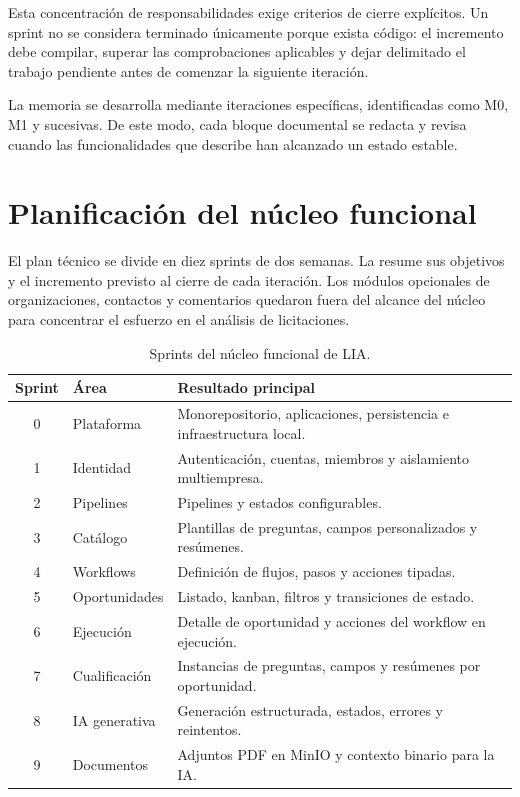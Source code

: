 Esta concentración de responsabilidades exige criterios de cierre explícitos.
Un sprint no se considera terminado únicamente porque exista código: el
incremento debe compilar, superar las comprobaciones aplicables y dejar
delimitado el trabajo pendiente antes de comenzar la siguiente iteración.

La memoria se desarrolla mediante iteraciones específicas, identificadas como
M0, M1 y sucesivas. De este modo, cada bloque documental se redacta y revisa
cuando las funcionalidades que describe han alcanzado un estado estable.

\section{Planificación del núcleo funcional}

El plan técnico se divide en diez sprints de dos semanas. La
 resume sus objetivos y el incremento previsto al cierre
de cada iteración. Los módulos opcionales de organizaciones, contactos y
comentarios quedaron fuera del alcance del núcleo para concentrar el esfuerzo
en el análisis de licitaciones.

\begin{table}[H]
  \centering
  \small
  \caption{Sprints del núcleo funcional de LIA.}
  \label{tab:core-sprints}
  \begin{tabular}{@{}clp{8.4cm}@{}}
    \toprule
    \textbf{Sprint} & \textbf{Área} & \textbf{Resultado principal} \\
    \midrule
    0 & Plataforma & Monorepositorio, aplicaciones, persistencia e infraestructura local. \\
    1 & Identidad & Autenticación, cuentas, miembros y aislamiento multiempresa. \\
    2 & Pipelines & Pipelines y estados configurables. \\
    3 & Catálogo & Plantillas de preguntas, campos personalizados y resúmenes. \\
    4 & Workflows & Definición de flujos, pasos y acciones tipadas. \\
    5 & Oportunidades & Listado, kanban, filtros y transiciones de estado. \\
    6 & Ejecución & Detalle de oportunidad y acciones del workflow en ejecución. \\
    7 & Cualificación & Instancias de preguntas, campos y resúmenes por oportunidad. \\
    8 & IA generativa & Generación estructurada, estados, errores y reintentos. \\
    9 & Documentos & Adjuntos PDF en MinIO y contexto binario para la IA. \\
    \bottomrule
  \end{tabular}
\end{table}

